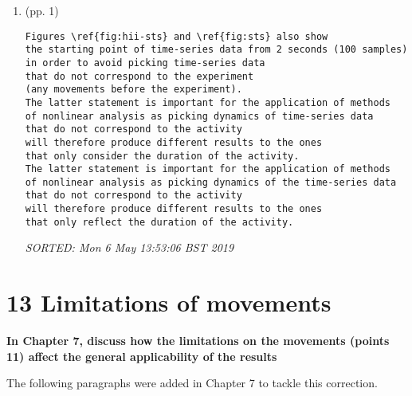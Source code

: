 \documentclass[12pt]{article}
\begin{document}


\begin{enumerate}

\item  (pp. 1)  

	\begin{verbatim}
Figures \ref{fig:hii-sts} and \ref{fig:sts} also show 
the starting point of time-series data from 2 seconds (100 samples) 
in order to avoid picking time-series data 
that do not correspond to the experiment 
(any movements before the experiment).
The latter statement is important for the application of methods
of nonlinear analysis as picking dynamics of time-series data 
that do not correspond to the activity
will therefore produce different results to the ones 
that only consider the duration of the activity. 
The latter statement is important for the application of methods
of nonlinear analysis as picking dynamics of the time-series data 
that do not correspond to the activity
will therefore produce different results to the ones 
that only reflect the duration of the activity. 
	\end{verbatim}
	\textit{
	SORTED:  Mon  6 May 13:53:06 BST 2019
	}
	\\


\end{enumerate}



\section*{13 Limitations of movements}
\textbf{
In Chapter 7, discuss how the limitations 
on the movements (points 11) affect the 
general applicability of the results
}


The following paragraphs were added in Chapter 7 
to tackle this correction.
\end{document}

